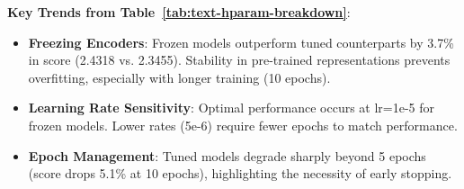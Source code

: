 \begin{table}[ht]
    \centering
    \caption{Impact of learning rate, epoch count, optimizer, and freezing on text-only performance. The best configuration is in bold.}
    \label{tab:text-hparam-breakdown}
\end{table}


\noindent \textbf{Key Trends from Table~\ref{tab:text-hparam-breakdown}}:
\newline

\begin{itemize}
    \item \textbf{Freezing Encoders}: Frozen models outperform tuned counterparts by 3.7\% in score (2.4318 vs. 2.3455). Stability in pre-trained representations prevents overfitting, especially with longer training (10 epochs).
    \item \textbf{Learning Rate Sensitivity}: Optimal performance occurs at lr=1e-5 for frozen models. Lower rates (5e-6) require fewer epochs to match performance.
    \item \textbf{Epoch Management}: Tuned models degrade sharply beyond 5 epochs (score drops 5.1\% at 10 epochs), highlighting the necessity of early stopping.
\end{itemize}

